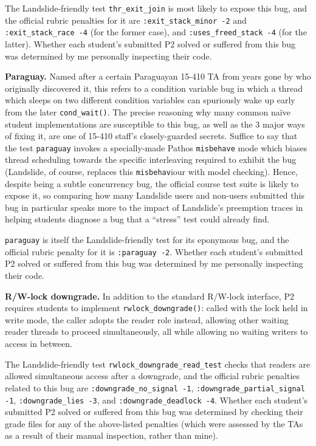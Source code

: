 The Landslide-friendly test {\tt thr\_exit\_join} is most likely to expose this bug, and
the official rubric penalties for it are
{\tt :exit\_stack\_minor -2} and
{\tt :exit\_stack\_race -4} (for the former case),
and
{\tt :uses\_freed\_stack -4} (for the latter).
Whether each student's submitted P2 solved or suffered from this bug
was determined by me personally inspecting their code.

{\bf Paraguay.}
Named after a certain Paraguayan 15-410 TA from years gone by who originally discovered it,
this refers to a condition variable bug in which a thread which sleeps on two different condition variables
can spuriously wake up early from the later {\tt cond\_wait()}.
The precise reasoning why many common na\"ive student implementations are susceptible to this bug,
as well as the 3 major ways of fixing it,
are one of 15-410 staff's closely-guarded secrets.
Suffice to say that the test {\tt paraguay} invokes a specially-made Pathos {\tt misbehave} mode
which biases thread scheduling towards the specific interleaving required to exhibit the bug
(Landslide, of course, replaces this {\tt misbehav}iour with model checking).
Hence, despite being a subtle concurrency bug,
the official course test suite is likely to expose it,
so comparing how many Landslide users and non-users submitted this bug in particular
speaks more to the impact of Landslide's preemption traces
in helping students diagnose a bug that a ``stress'' test could already find.

{\tt paraguay} is itself the Landslide-friendly test for its eponymous bug, and
the official rubric penalty for it is
{\tt :paraguay -2}.
Whether each student's submitted P2 solved or suffered from this bug
was determined by me personally inspecting their code.

{\bf R/W-lock downgrade.}
In addition to the standard R/W-lock interface,
P2 requires students to implement {\tt rwlock\_downgrade()}:
called with the lock held in write mode,
the caller adopts the reader role instead,
allowing other waiting reader threads to proceed simultaneously,
all while allowing no waiting writers to access in between.

The Landslide-friendly test {\tt rwlock\_downgrade\_read\_test}
checks that readers are allowed simultaneous access after a downgrade, and
the official rubric penalties related to this bug are
{\tt :downgrade\_no\_signal -1},
{\tt :downgrade\_partial\_signal -1}, %
{\tt :downgrade\_lies -3}, and
{\tt :downgrade\_deadlock -4}.
Whether each student's submitted P2 solved or suffered from this bug
was determined by checking their grade files for any of the above-listed penalties
(which were assessed by the TAs as a result of their manual inspection, rather than mine).

